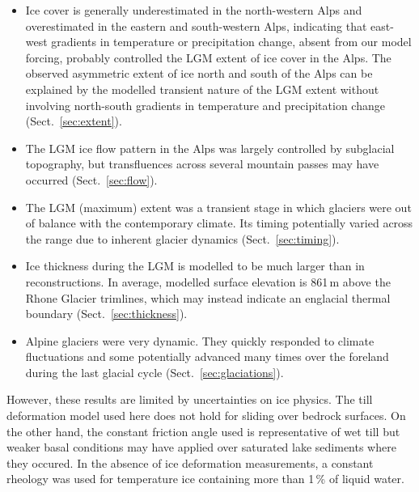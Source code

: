 \documentclass[tc, manuscript]{copernicus}
\begin{document}
    \begin{itemize}
      \item Ice cover is generally underestimated in the north-western Alps and
            overestimated in the eastern and south-western Alps, indicating
            that east-west
            gradients in temperature or precipitation change, absent from our
            model forcing, probably controlled the LGM extent of ice cover in
            the Alps. The observed asymmetric extent of ice north and south of
            the Alps can be explained by the modelled transient nature of the
            LGM extent without involving north-south gradients in temperature
            and precipitation change (Sect.~\ref{sec:extent}).
      \item The LGM ice flow pattern in the Alps was largely controlled by
            subglacial topography, but transfluences across several mountain
            passes may have occurred (Sect.~\ref{sec:flow}).
      \item The LGM (maximum) extent was a transient stage in which glaciers
            were out of balance with the
            contemporary climate. Its timing potentially varied across the
            range due to inherent glacier dynamics (Sect.~\ref{sec:timing}).
      \item Ice thickness during the LGM is modelled to be much larger than in
            reconstructions. In average, modelled surface elevation is 861\,m
            above the Rhone Glacier trimlines, which may instead indicate an
            englacial thermal boundary (Sect.~\ref{sec:thickness}).
      \item Alpine glaciers were very dynamic. They quickly
            responded to climate fluctuations and some potentially advanced
            many times over the foreland during the last glacial cycle
            (Sect.~\ref{sec:glaciations}).
    \end{itemize}

    However, these results are limited by uncertainties on ice physics. The
    till deformation model used here does not hold for sliding over
    bedrock surfaces. On the other hand, the constant friction angle used is
    representative of wet till but weaker basal conditions may have applied
    over saturated lake sediments where they occured. In the absence of ice
    deformation measurements, a constant rheology was used for temperature ice
    containing more than 1\,\% of liquid water.
\end{document}
